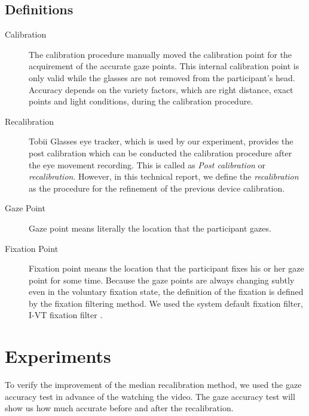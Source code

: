 \documentclass{article}
\begin{document}
\subsection{Definitions}
\label{definitions}
\begin{description}

\item[Calibration]
The calibration procedure manually moved the calibration point for the acquirement of the accurate gaze points. This internal calibration point is only valid while the glasses are not removed from the participant's head. Accuracy depends on the variety factors, which are right distance, exact points and light conditions, during the calibration procedure.

\item[Recalibration]
Tobii Glasses eye tracker, which is used by our experiment, provides the post calibration which can be conducted the calibration procedure after the eye movement recording. This is called as \textit{Post calibration} or \textit{recalibration}. However, in this technical report, we define the \textit{recalibration} as the procedure for the refinement of the previous device calibration.

\item[Gaze Point]
Gaze point means literally the location that the participant gazes.

\item[Fixation Point]
Fixation point means the location that the participant fixes his or her gaze point for some time. Because the gaze points are always changing subtly even in the voluntary fixation state, the definition of the fixation is defined by the fixation filtering method. We used the system default fixation filter, I-VT fixation filter \citep{Salvucci2000}.

\end{description} 
 

\section{Experiments}

To verify the improvement of the median recalibration method, we used the gaze accuracy test in advance of the watching the video. The gaze accuracy test will show us how much accurate before and after the recalibration.
\end{document}
